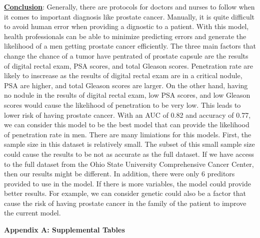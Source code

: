 \documentclass[11pt]{article}\usepackage[]{graphicx}\usepackage[]{color}
\begin{document}
\noindent\textbf{\underline{Conclusion}}: Generally, there are protocols for doctors and nurses to follow when it comes to important diagnosis like prostate cancer. Manually, it is quite difficult to avoid human error when providing a dignostic to a patient. With this model, health professionals can be able to minimize predicting errors and generate the likelihood of a men getting prostate cancer efficiently. The three main factors that change the chance of a tumor have pentrated of prostate capsule are the results of digital rectal exam, PSA scores, and total Gleason scores. Penetration rate are likely to inscrease as the results of digital rectal exam are in a critical nodule, PSA are higher, and total Gleason scores are larger. On the other hand, having no nodule in the results of digital rectal exam, low PSA scores, and low Gleason scores would cause the likelihood of penetration to be very low. This leads to lower risk of having prostate cancer. With an AUC of 0.82 and accuracy of 0.77, we can consider this model to be the best model that can provide the likelihood of penetration rate in men. There are many limiations for this models. First, the sample size in this dataset is relatively small. The subset of this small sample size could cause the results to be not as accurate as the full dataset. If we have access to the full dataset from the Ohio State University Comprehensive Cancer Center, then our results might be different. In addition, there were only 6 preditors provided to use in the model. If there is more variables, the model could provide better results. For example, we can consider genetic could also be a factor that cause the risk of having prostate cancer in the family of the patient to improve the current model.          
\hfill \break

\clearpage
\newpage
\noindent \Large{{\bf Appendix A: Supplemental Tables}}
\end{document}
